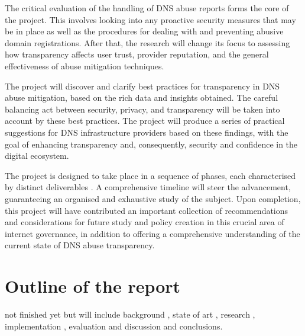 The critical evaluation of the handling of DNS abuse reports forms the core of the project. This involves looking into any proactive security measures that may be in place as well as the procedures for dealing with and preventing abusive domain registrations. After that, the research will change its focus to assessing how transparency affects user trust, provider reputation, and the general effectiveness of abuse mitigation techniques.

The project will discover and clarify best practices for transparency in DNS abuse mitigation, based on the rich data and insights obtained. The careful balancing act between security, privacy, and transparency will be taken into account by these best practices. The project will produce a series of practical suggestions for DNS infrastructure providers based on these findings, with the goal of enhancing transparency and, consequently, security and confidence in the digital ecosystem.

The project is designed to take place in a sequence of phases, each characterised by distinct deliverables . A comprehensive timeline will steer the advancement, guaranteeing an organised and exhaustive study of the subject. Upon completion, this project will have contributed an important collection of recommendations and considerations for future study and policy creation in this crucial area of internet governance, in addition to offering a comprehensive understanding of the current state of DNS abuse transparency.

\section{Outline of the report}
not finished yet but will include background , state of art , research , implementation , evaluation and discussion and conclusions. 